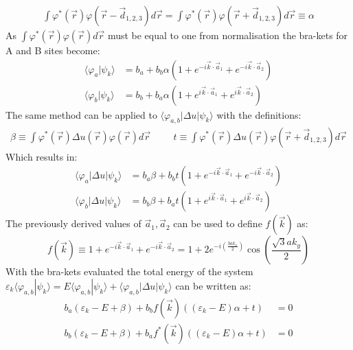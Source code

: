 			\begin{align}
				\int\varphi^{*}\left(\vec{r}\right)\varphi\left(\vec{r}-\vec{d}_{1,2,3}\right)d\vec{r}=\int\varphi^{*}\left(\vec{r}\right)\varphi\left(\vec{r}+\vec{d}_{1,2,3}\right)d\vec{r}\equiv\alpha
			\end{align}
			As $\int\varphi^{*}\left(\vec{r}\right)\varphi\left(\vec{r}\right)d\vec{r}$ must be equal to one from normalisation the bra-kets for A and B sites become:
			\begin{align}
				\langle\varphi_{a}|\psi_{k}\rangle&=b_{a}+b_{b}\alpha\left(1+e^{-i\vec{k}\cdot\vec{a}_{1}}+e^{-i\vec{k}\cdot\vec{a}_{2}}\right)\\
				\langle\varphi_{b}|\psi_{k}\rangle&=b_{b}+b_{a}\alpha\left(1+e^{i\vec{k}\cdot\vec{a}_{1}}+e^{i\vec{k}\cdot\vec{a}_{2}}\right)
			\end{align}
			The same method can be applied to $\langle\varphi_{a,b}|\Delta u|\psi_{k}\rangle$  with the definitions:
			\begin{align}
				\beta\equiv\int\varphi^{*}\left(\vec{r}\right)\Delta u\left(\vec{r}\right)\varphi\left(\vec{r}\right) d\vec{r}\hspace{1cm}t\equiv\int\varphi^{*}\left(\vec{r}\right)\Delta u\left(\vec{r}\right)\varphi\left(\vec{r}+\vec{d}_{1,2,3}\right) d\vec{r}
			\end{align}
			Which results in:
			\begin{align}
				\langle\varphi_{a}|\Delta u|\psi_{k}\rangle&=b_{a}\beta+b_{b}t\left(1+e^{-i\vec{k}\cdot\vec{a}_{1}}+e^{-i\vec{k}\cdot\vec{a}_{2}}\right)\\
				\langle\varphi_{b}|\Delta u|\psi_{k}\rangle&=b_{b}\beta+b_{a}t\left(1+e^{i\vec{k}\cdot\vec{a}_{1}}+e^{i\vec{k}\cdot\vec{a}_{2}}\right)
			\end{align}
			The previously derived values of $\vec{a}_{1}, \vec{a}_{2}$ can be used to define $f\left(\vec{k}\right)$ as:
			\begin{equation}
				f\left(\vec{k}\right)\equiv 1+e^{-i\vec{k}\cdot\vec{a}_{1}}+e^{-i\vec{k}\cdot\vec{a}_{2}}=1+2e^{-i\left(\frac{3ak_{x}}{2}\right)}\cos\left(\frac{\sqrt{3}ak_{y}}{2}\right)
				\label{introduction-fk}
			\end{equation}
			With the bra-kets evaluated the total energy of the system $\varepsilon_{k}\langle\varphi_{a,b}|\psi_{k}\rangle=E\langle\varphi_{a,b}|\psi_{k}\rangle+\langle\varphi_{a,b}|\Delta u|\psi_{k}\rangle$ can be written as:
			\begin{align}
				b_{a}\left(\varepsilon_{k}-E+\beta\right)+b_{b}f\left(\vec{k}\right)\left(\left(\varepsilon_{k}-E\right)\alpha+t\right)&=0\\
				b_{b}\left(\varepsilon_{k}-E+\beta\right)+b_{a}f^{*}\left(\vec{k}\right)\left(\left(\varepsilon_{k}-E\right)\alpha+t\right)&=0
			\end{align}

